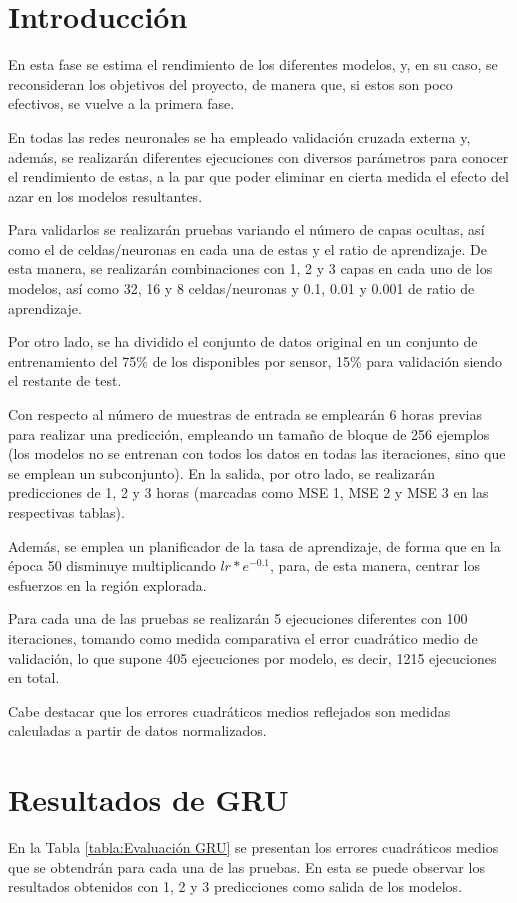 
\section{Introducción}
En esta fase se estima el rendimiento de los diferentes modelos, y, en su caso, 
se reconsideran los objetivos del proyecto, de manera que, si estos son poco efectivos,
se vuelve a la primera fase.

En todas las redes neuronales se ha empleado validación cruzada externa y, además, se realizarán
diferentes ejecuciones con diversos parámetros para conocer el rendimiento de estas, a 
la par que poder eliminar en cierta medida el efecto del azar en los modelos 
resultantes.

Para validarlos se realizarán pruebas variando el número de capas
ocultas, así como el de celdas/neuronas en cada una de estas y el ratio de aprendizaje.
De esta manera, se realizarán combinaciones con 1, 2 y 3 capas en cada uno de los modelos, 
así como 32, 16 y 8 celdas/neuronas y 0.1, 0.01 y 0.001 de ratio de aprendizaje. 

Por otro lado, se ha dividido el conjunto de datos original en un conjunto de entrenamiento del 75\% de los disponibles
por sensor, 15\% para validación siendo el restante de test.

Con respecto al número de muestras de entrada se emplearán 6 horas previas para realizar
una predicción, empleando un tamaño de bloque de 256 ejemplos (los modelos 
no se entrenan con todos los datos en todas las iteraciones, sino que se emplean un subconjunto).
En la salida, por otro lado, se realizarán predicciones de 1, 2 y 3 horas (marcadas como MSE 1, MSE 2 y MSE 3 en las
respectivas tablas).

Además, se emplea un planificador de la tasa de aprendizaje, de forma
que en la época 50 disminuye multiplicando \(lr * e^{-0.1}\), para, de esta manera,
centrar los esfuerzos en la región explorada.

Para cada una de las pruebas se realizarán 5 ejecuciones diferentes con 100 iteraciones, 
tomando como medida comparativa el error cuadrático medio de validación, lo que supone 405 ejecuciones por modelo, es decir, 1215 ejecuciones en total.

Cabe destacar que los errores cuadráticos medios reflejados son medidas calculadas a partir de 
datos normalizados.

\newpage

\section{Resultados de GRU}
En la Tabla \ref{tabla:Evaluación GRU} se presentan los errores cuadráticos medios
que se obtendrán para cada una de las pruebas. En esta se puede observar los resultados obtenidos con 1, 2 y 3 predicciones 
como salida de los modelos. 

